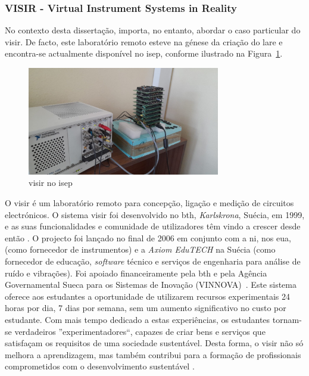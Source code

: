\subsubsection{VISIR - Virtual Instrument Systems in Reality}
\label{sec:visir}
No contexto desta dissertação, importa, no entanto, abordar o caso particular do \acrshort{visir}. De facto, este laboratório remoto esteve na génese da criação do \acrshort{lare} e encontra-se actualmente disponível no \acrshort{isep}, conforme ilustrado na Figura~\ref{fig:visirISEP}.
\begin{figure}[hbtp]
    \centering
    \includegraphics[width=0.75\textwidth]{figures/visirISEP.jpeg}
    \caption{\acrshort{visir} no \acrshort{isep}}
    \label{fig:visirISEP}
\end{figure}

O \acrshort{visir} é um laboratório remoto para concepção, ligação e medição de circuitos electrónicos. O sistema \acrshort{visir} foi desenvolvido no \acrfull{bth}, \textit{Karlskrona}, Suécia, em 1999, e as suas funcionalidades e comunidade de utilizadores têm vindo a crescer desde então \cite{RemoteLabsImpactVISIR}. O projecto foi lançado no final de 2006 em conjunto com a \acrshort{ni}, nos \acrshort{eua}, (como fornecedor de instrumentos) e a \textit{Axiom EduTECH} na Suécia (como fornecedor de educação, \textit{software} técnico e serviços de engenharia para análise de ruído e vibrações). Foi apoiado financeiramente pela \acrshort{bth} e pela Agência Governamental Sueca para os Sistemas de Inovação (VINNOVA)~\cite{VISIRExperiencesChallenges}. Este sistema oferece aos estudantes a oportunidade de utilizarem recursos experimentais 24 horas por dia, 7 dias por semana, sem um aumento significativo no custo por estudante. Com mais tempo dedicado a estas experiências, os estudantes tornam-se verdadeiros ''experimentadores``, capazes de criar bens e serviços que satisfaçam os requisitos de uma sociedade sustentável. Desta forma, o \acrshort{visir} não só melhora a aprendizagem, mas também contribui para a formação de profissionais comprometidos com o desenvolvimento sustentável \cite{OpenLabs77:online}.

